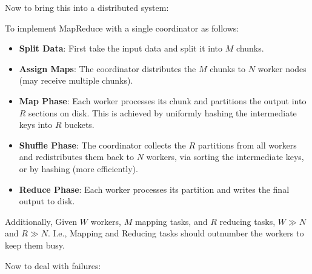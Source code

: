 \noindent
Now to bring this into a distributed system:

\begin{Def}

    To implement MapReduce with a single coordinator as follows:
    \begin{itemize}
        \item \textbf{Split Data}: First take the input data and split it into $M$ chunks.
        \item \textbf{Assign Maps}: The coordinator distributes the $M$ chunks to $N$ worker nodes (may receive multiple chunks).
        \item \textbf{Map Phase}: Each worker processes its chunk and partitions the output into $R$ sections on disk. This is 
        achieved by uniformly hashing the intermediate keys into $R$ buckets.
        \item \textbf{Shuffle Phase}: The coordinator collects the $R$ partitions from all workers and redistributes them back to $N$ workers, via 
        sorting the intermediate keys, or by hashing (more efficiently).
        \item \textbf{Reduce Phase}: Each worker processes its partition and writes the final output to disk.
    \end{itemize}

    \noindent
    Additionally, Given $W$ workers, $M$ mapping tasks, and $R$ reducing tasks, $W \gg N$ and $R \gg N$. I.e.,
    Mapping and Reducing tasks should outnumber the workers to keep them busy.
\end{Def}

\newpage 
\noindent
Now to deal with failures:


